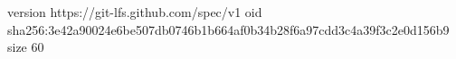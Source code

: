 version https://git-lfs.github.com/spec/v1
oid sha256:3e42a90024e6be507db0746b1b664af0b34b28f6a97cdd3c4a39f3c2e0d156b9
size 60
